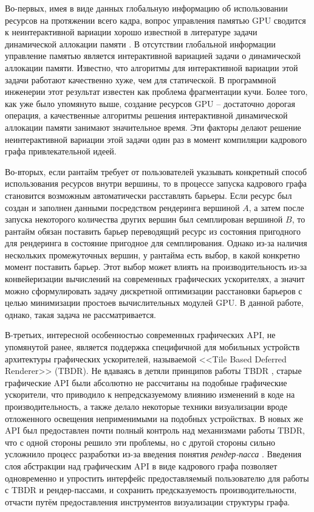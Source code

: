 Во-первых, имея в виде данных глобальную информацию об использовании ресурсов на протяжении всего кадра, вопрос управления памятью GPU сводится к неинтерактивной вариации хорошо известной в литературе задачи динамической аллокации памяти \cite[с. 226]{10.5555/574848}.
В отсутствии глобальной информации управление памятью является интерактивной вариацией задачи о динамической аллокации памяти.
Известно, что алгоритмы для интерактивной вариации этой задачи работают качественно хуже, чем для статической.
В программной инженерии этот результат известен как проблема фрагментации кучи.
Более того, как уже было упомянуто выше, создание ресурсов GPU -- достаточно дорогая операция, а качественные алгоритмы решения интерактивной динамической аллокации памяти занимают значительное время.
Эти факторы делают решение неинтерактивной вариации этой задачи один раз в момент компиляции кадрового графа привлекательной идеей.

Во-вторых, если рантайм требует от пользователей указывать конкретный способ использования ресурсов внутри вершины, то в процессе запуска кадрового графа становится возможным автоматически расставлять барьеры.
Если ресурс был создан и заполнен данными посредством рендеринга вершиной $A$, а затем после запуска некоторого количества других вершин был семплирован вершиной $B$, то рантайм обязан поставить барьер переводящий ресурс из состояния пригодного для рендеринга в состояние пригодное для семплирования.
Однако из-за наличия нескольких промежуточных вершин, у рантайма есть выбор, в какой конкретно момент поставить барьер.
Этот выбор может влиять на производительность из-за конвейеризации вычислений на современных графических ускорителях, а значит можно сформулировать задачу дискретной оптимизации расстановки барьеров с целью минимизации простоев вычислительных модулей GPU.
В данной работе, однако, такая задача не рассматривается.

В-третьих, интересной особенностью современных графических API, не упомянутой ранее, является поддержка специфичной для мобильных устройств архитектуры графических ускорителей, называемой <<Tile Based Deferred Renderer>> (TBDR).
Не вдаваясь в детяли принципов работы TBDR , старые графические API были абсолютно не рассчитаны на подобные графические ускорители, что приводило к непредсказуемому влиянию изменений в коде на производительность, а также делало некоторые техники визуализации вроде отложенного освещения неприменимыми на подобных устройствах.
В новых же API был предоставлен почти полный контроль над механизмами работы TBDR, что с одной стороны решило эти проблемы, но с другой стороны сильно усложнило процесс разработки из-за введения понятия \textit{рендер-пасса} \cite[раздел~8]{VulkanSpec}.
Введения слоя абстракции над графическим API в виде кадрового графа позволяет одновременно и упростить интерфейс предоставляемый пользователю для работы с TBDR и рендер-пассами, и сохранить предсказуемость производительности, отчасти путём предоставления инструментов визуализации структуры графа.


